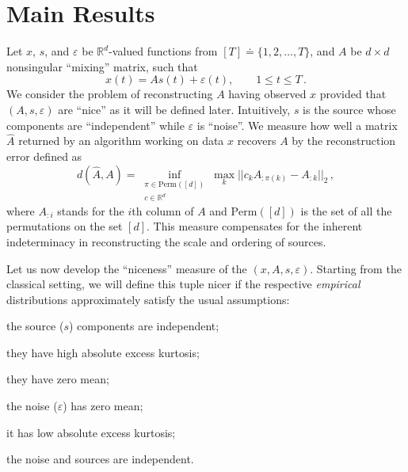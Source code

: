 \documentclass{article} %
\newcommand{\real}{\mathbb{R}}
\newcommand{\eps}{\epsilon}
\renewcommand{\epsilon}{\varepsilon}
\theoremstyle{definition}
\begin{document}
\section{Main Results}
\label{sec:main}
Let $x$, $s$, and $\epsilon$ be $\real^d$-valued functions from $[T]\doteq\{1,2,\ldots,T\}$, and $A$ be $d\times d$ nonsingular ``mixing'' matrix, such that 
\begin{equation}
\label{eq:ICA}
x(t) = As(t)+\epsilon(t), \qquad 1\le t\le T\,.
\end{equation}
We consider the problem of reconstructing $A$ having observed $x$ provided that $(A,s,\epsilon)$ are ``nice'' as it will be defined later. Intuitively, $s$ is the source whose components are ``independent'' while $\epsilon$ is ``noise''.
We measure how well a matrix $\hat{A}$ returned by an algorithm working on data $x$ 
recovers $A$ by the reconstruction error defined as
\[
d(\hat{A}, A) = \inf_{
		\substack{\pi \in \mathrm{Perm}([d]) \\ c\in \real^d}} 
		\max_{k} || c_k A_{:\pi(k)} - A_{:k} ||_2\,,
\]
where $A_{:i}$ stands for the $i$th column of $A$ and
$\mathrm{Perm}([d])$ is the set of all the permutations on the set $[d]$.
This measure compensates for the inherent indeterminacy in reconstructing the scale and ordering of sources.

Let us now develop the ``niceness'' measure of the $(x,A,s,\eps)$. 
Starting from the classical setting, we will define this tuple nicer if the respective \emph{empirical} 
distributions approximately satisfy the usual assumptions: 
\begin{inparaenum}
\item the source ($s$) components are independent;
\item they have high absolute excess kurtosis;
\item they have zero mean;
\item the noise ($\eps$) has  zero mean;
\item it has low absolute excess kurtosis;
\item the noise and sources are independent.
\end{inparaenum}
\end{document}
